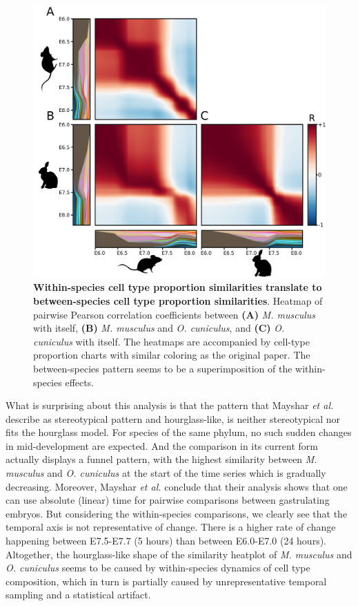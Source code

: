 \begin{figure}[H]
    \center
    \includegraphics[width=0.8\linewidth]{ch.hourglass/images/mouse_rabbit_cellproportions.png}
    \caption{\textbf{Within-species cell type proportion similarities translate to between-species cell type proportion similarities}. Heatmap of pairwise Pearson correlation coefficients between \textbf{(A)} \textit{M. musculus} with itself, \textbf{(B)} \textit{M. musculus} and \textit{O. cuniculus}, and \textbf{(C)} \textit{O. cuniculus} with itself. The heatmaps are accompanied by cell-type proportion charts with similar coloring as the original paper. The between-species pattern seems to be a superimposition of the within-species effects.}
    \label{fig:cellproportions}
\end{figure}

What is surprising about this analysis is that the pattern that Mayshar \textit{et al.} describe as stereotypical pattern and hourglass-like, is neither stereotypical nor fits the hourglass model. For species of the same phylum, no such sudden changes in mid-development are expected. And the comparison in its current form actually displays a funnel pattern, with the highest similarity between \textit{M. musculus} and \textit{O. cuniculus} at the start of the time series which is gradually decreasing. Moreover, Mayshar \textit{et al.} conclude that their analysis shows that one can use absolute (linear) time for pairwise comparisons between gastrulating embryos. But considering the within-species comparisons, we clearly see that the temporal axis is not representative of change. There is a higher rate of change happening between E7.5-E7.7 (5 hours) than between E6.0-E7.0 (24 hours). Altogether, the hourglass-like shape of the similarity heatplot of  \textit{M. musculus} and \textit{O. cuniculus} seems to be caused by within-species dynamics of cell type composition, which in turn is partially caused by unrepresentative temporal sampling and a statistical artifact.

